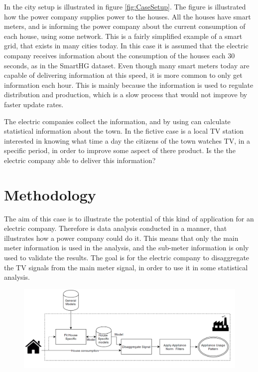 In the city setup is illustrated in figure \ref{fig:CaseSetup}. The figure is illustrated how the power company supplies power to the houses. All the houses have smart meters, and is informing the power company about the current consumption of each house, using some network. This is a fairly simplified example of a smart grid, that exists in many cities today. In this case it is assumed that the electric company receives information about the consumption of the houses each 30 seconds, as in the SmartHG dataset. Even though many smart meters today are capable of delivering information at this speed, it is more common to only get information each hour. This is mainly because the information is used to regulate distribution and production, which is a slow process that would not improve by faster update rates.  

The electric companies collect the information, and by using  can calculate statistical information about the town. In the fictive case is a local TV station interested in knowing what time a day the citizens of the town watches TV, in a specific period, in order to improve some aspect of there product. Is the the electric company able to deliver this information? 

\section{Methodology}
The aim of this case is to illustrate the potential of this kind of application for an electric company. Therefore is data analysis conducted in a manner, that illustrates how a power company could do it. This means that only the main meter information is used in the analysis, and the sub-meter information is only used to validate the results.  The goal is for the electric company to disaggregate the TV signals from the main meter signal, in order to use it in some statistical analysis. 

\begin{figure}[H]
\centering
\includegraphics[width=1\textwidth]{billeder/Electric company method.png}
\caption{}
\label{fig:ECM}
\end{figure}


